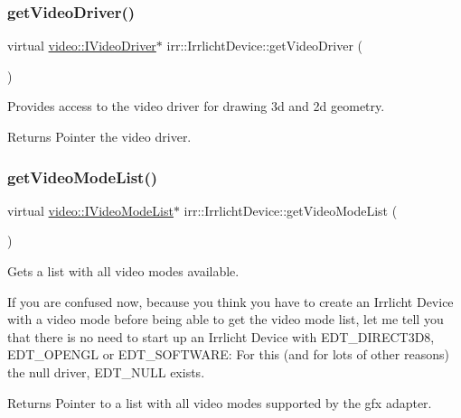\subsubsection{\texorpdfstring{get\+Video\+Driver()}{getVideoDriver()}\hspace{0.1cm}{\footnotesize\ttfamily [2/2]}}
{\footnotesize\ttfamily virtual \hyperlink{classirr_1_1video_1_1IVideoDriver}{video\+::\+I\+Video\+Driver}$\ast$ irr\+::\+Irrlicht\+Device\+::get\+Video\+Driver (\begin{DoxyParamCaption}{ }\end{DoxyParamCaption})\hspace{0.3cm}{\ttfamily [pure virtual]}}



Provides access to the video driver for drawing 3d and 2d geometry. 

\begin{DoxyReturn}{Returns}
Pointer the video driver. 
\end{DoxyReturn}
\mbox{\label{classirr_1_1IrrlichtDevice_a8872867a5ad728a4673679e9e8f469e7}} 
\subsubsection{\texorpdfstring{get\+Video\+Mode\+List()}{getVideoModeList()}\hspace{0.1cm}{\footnotesize\ttfamily [1/2]}}
{\footnotesize\ttfamily virtual \hyperlink{classirr_1_1video_1_1IVideoModeList}{video\+::\+I\+Video\+Mode\+List}$\ast$ irr\+::\+Irrlicht\+Device\+::get\+Video\+Mode\+List (\begin{DoxyParamCaption}{ }\end{DoxyParamCaption})\hspace{0.3cm}{\ttfamily [pure virtual]}}



Gets a list with all video modes available. 

If you are confused now, because you think you have to create an Irrlicht Device with a video mode before being able to get the video mode list, let me tell you that there is no need to start up an Irrlicht Device with E\+D\+T\+\_\+\+D\+I\+R\+E\+C\+T3\+D8, E\+D\+T\+\_\+\+O\+P\+E\+N\+GL or E\+D\+T\+\_\+\+S\+O\+F\+T\+W\+A\+RE\+: For this (and for lots of other reasons) the null driver, E\+D\+T\+\_\+\+N\+U\+LL exists. \begin{DoxyReturn}{Returns}
Pointer to a list with all video modes supported by the gfx adapter. 
\end{DoxyReturn}
\mbox{\label{classirr_1_1IrrlichtDevice_a8872867a5ad728a4673679e9e8f469e7}} 
